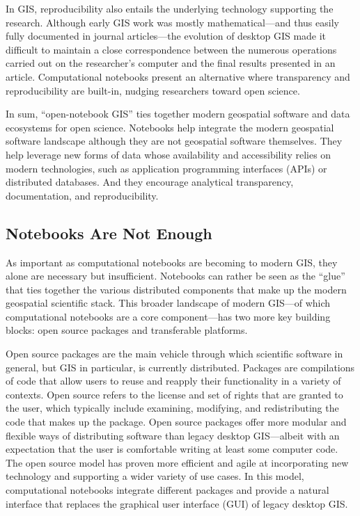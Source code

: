 \documentclass[11pt,letterpaper]{article}
\begin{document}
In GIS, reproducibility also entails the underlying technology supporting the research. Although early GIS work was mostly mathematical---and thus easily fully documented in journal articles---the evolution of desktop GIS made it difficult to maintain a close correspondence between the numerous operations carried out on the researcher's computer and the final results presented in an article. Computational notebooks present an alternative where transparency and reproducibility are built-in, nudging researchers toward open science.

In sum, \enquote{open-notebook GIS} ties together modern geospatial software and data ecosystems for open science. Notebooks help integrate the modern geospatial software landscape although they are not geospatial software themselves. They help leverage new forms of data whose availability and accessibility relies on modern technologies, such as application programming interfaces (APIs) or distributed databases. And they encourage analytical transparency, documentation, and reproducibility.

\subsection{Notebooks Are Not Enough}

As important as computational notebooks are becoming to modern GIS, they alone are necessary but insufficient. Notebooks can rather be seen as the \enquote{glue} that ties together the various distributed components that make up the modern geospatial scientific stack. This broader landscape of modern GIS---of which computational notebooks are a core component---has two more key building blocks: open source packages and transferable platforms.

Open source packages are the main vehicle through which scientific software in general, but GIS in particular, is currently distributed. Packages are compilations of code that allow users to reuse and reapply their functionality in a variety of contexts. Open source refers to the license and set of rights that are granted to the user, which typically include examining, modifying, and redistributing the code that makes up the package. Open source packages offer more modular and flexible ways of distributing software than legacy desktop GIS---albeit with an expectation that the user is comfortable writing at least some computer code. The open source model has proven more efficient and agile at incorporating new technology and supporting a wider variety of use cases. In this model, computational notebooks integrate different packages and provide a natural interface that replaces the graphical user interface (GUI) of legacy desktop GIS.
\end{document}
